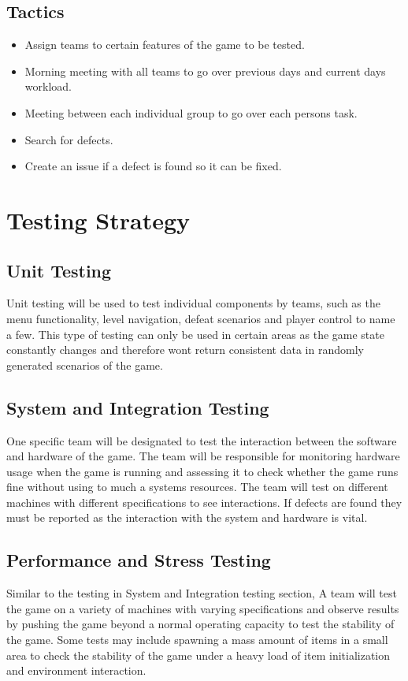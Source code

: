 \documentclass[a4paper, 10pt]{article}
\begin{document}
    \subsection{Tactics}
    \begin{itemize}
        \item Assign teams to certain features of the game to be tested.
        \item Morning meeting with all teams to go over previous days and current days workload.
        \item Meeting between each individual group to go over each persons task.
        \item Search for defects.
        \item Create an issue if a defect is found so it can be fixed.
    \end{itemize}
\section{Testing Strategy}
    \subsection{Unit Testing}
    Unit testing will be used to test individual components by teams, such as the menu functionality, level navigation, defeat scenarios and player control to name a few. This type of testing can only be used in certain areas as the game state constantly changes and therefore wont return consistent data in randomly generated scenarios of the game.
    \subsection{System and Integration Testing}
    One specific team will be designated to test the interaction between the software and hardware of the game. The team will be responsible for monitoring hardware usage when the game is running and assessing it to check whether the game runs fine without using to much a systems resources. \newline
    The team will test on different machines with different specifications to see interactions. If defects are found they must be reported as the interaction with the system and hardware is vital.
    \subsection{Performance and Stress Testing}
    Similar to the testing in System and Integration testing section, A team will test the game on a variety of machines with varying specifications and observe results by pushing the game beyond a normal operating capacity to test the stability of the game. Some tests may include spawning a mass amount of items in a small area to check the stability of the game under a heavy load of item initialization and environment interaction.
\end{document}
